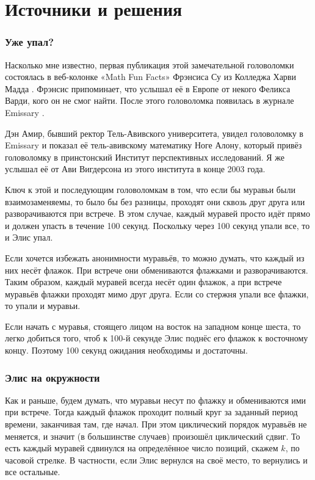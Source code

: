 \section*{Источники и решения}

\subsubsection*{Уже упал?}

Насколько мне известно, первая публикация этой замечательной головоломки состоялась в веб-колонке «Math Fun Facts» Фрэнсиса Су из Колледжа Харви Мадда \cite{math-fun-facts}.
Фрэнсис припоминает, что услышал её в Европе от некого Феликса Варди, кого он не смог найти.
После этого головоломка появилась в журнале Emissary \cite[Весна/Осень 2003]{3}.

Дэн Амир, бывший ректор Тель-Авивского университета, увидел головоломку в Emissary и показал её тель-авивскому математику Ноге Алону, который привёз головоломку в принстонский Институт перспективных исследований.
Я же услышал её от Ави Вигдерсона из этого института в конце 2003 года.

Ключ к этой и последующим головоломкам в том, что если бы муравьи были взаимозаменяемы, то было бы без разницы, проходят они сквозь друг друга или разворачиваются при встрече.
В этом случае, каждый муравей просто идёт прямо и должен упасть в течение 100 секунд.
Поскольку через 100 секунд упали все, то и Элис упал.

Если хочется избежать анонимности муравьёв, то можно думать, что каждый из них несёт флажок.
При встрече они обмениваются флажками и разворачиваются.
Таким образом, каждый муравей всегда несёт один флажок, а при встрече муравьёв флажки проходят мимо друг друга.
Если со стержня упали все флажки, то упали и муравьи.

Если начать с муравья, стоящего лицом на восток на западном конце шеста, то легко добиться того, чтоб к 100-й секунде Элис поднёс его флажок к восточному концу.
Поэтому 100 секунд ожидания необходимы и достаточны.

\subsubsection*{Элис на окружности}

Как и раньше, будем думать, что муравьи несут по флажку и обмениваются ими при встрече.
Тогда каждый флажок проходит полный круг за заданный период времени, заканчивая там, где начал.
При этом циклический порядок муравьёв не меняется, и значит (в большинстве случаев) произошёл циклический сдвиг.
То есть каждый муравей сдвинулся на определённое число позиций, скажем $k$, по часовой стрелке.
В частности, если Элис вернулся на своё место, то вернулись и все остальные.

